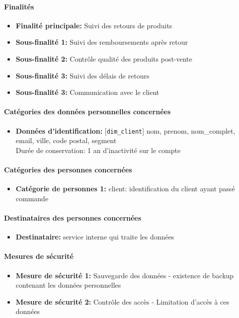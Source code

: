 \documentclass[11pt]{article}
\begin{document}
\paragraph{Finalités}
\begin{itemize}
    \item {\bf Finalité principale:} Suivi des retours de produits
    \item {\bf Sous-finalité 1:} Suivi des remboursements après retour
    \item {\bf Sous-finalité 2:} Contrôle qualité des produits post-vente
    \item {\bf Sous-finalité 3:} Suivi des délais de retours
    \item {\bf Sous-finalité 3:} Communication avec le client
\end{itemize}

\paragraph{Catégories des données personnelles concernées}
\begin{itemize}
    \item {\bf Données d'identification:} [\texttt{dim\_client}] nom, prenom, nom\_complet, email, ville, code postal, segment \\
          Durée de conservation: 1 an d'inactivité sur le compte
\end{itemize}

\paragraph{Catégories des personnes concernées}
\begin{itemize}
    \item {\bf Catégorie de personnes 1:} client: identification du client ayant passé commande
\end{itemize}

\paragraph{Destinataires des personnes concernées}
\begin{itemize}
    \item {\bf Destinataire:} service interne qui traite les données
\end{itemize}

\paragraph{Mesures de sécurité}
\begin{itemize}
    \item {\bf Mesure de sécurité 1:} Sauvegarde des données - existence de backup contenant les données personnelles
    \item {\bf Mesure de sécurité 2:} Contrôle des accès - Limitation d'accès à ces données
\end{itemize}
\end{document}
